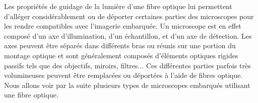 
Les propriétés de guidage de la lumière d'une fibre optique lui permettent d'alléger considérablement ou de déporter certaines parties des microscopes pour les rendre compatibles avec l'imagerie embarquée. Un microscope est en effet composé d'un axe d'illumination, d'un échantillon, et d'un axe de détection. Les axes peuvent être séparés dans différents bras ou réunis sur une portion du montage optique et sont généralement composés d'éléments optiques rigides passifs tels que des objectifs, miroirs, filtres... Ces différentes parties parfois très volumineuses peuvent être remplacées ou déportées à l'aide de fibres optique. Nous allons voir par la suite plusieurs types de microscopes embarqués utilisant une fibre optique.

